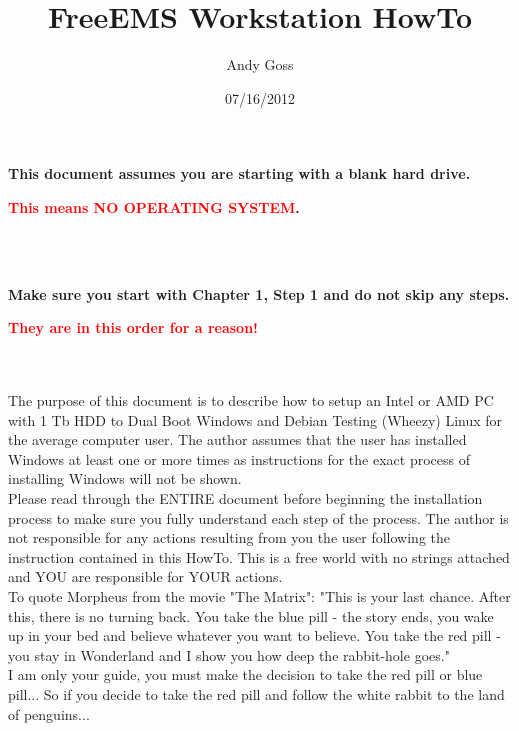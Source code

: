 \documentclass[12pt,notitlepage,onecolumn,oneside,openany]{memoir}
\title{\textsf{FreeEMS Workstation HowTo}}
\author{\textsf{Andy Goss}}
\date{\textsf{07/16/2012}}
\begin{document}
\maketitle

\centerline{\textbf{\textsf{This document assumes you are starting with a blank hard drive.}}} 
\centerline{\textbf{\textsf{\textcolor{red}{This means NO OPERATING SYSTEM}.}}}
\\
\textcolor{white}{\textsf{xyz}}
\\
\centerline{\textbf{\textsf{Make sure you start with Chapter 1, Step 1 and do not skip any steps.}}}
\centerline{\textbf{\textsf{\textcolor{red}{They are in this order for a reason!}}}}
\\
\textcolor{white}{\textsf{xyz2}}
\\
\textsf{The purpose of this document is to describe how to setup an Intel or AMD PC with 1 Tb HDD to Dual Boot Windows and Debian Testing (Wheezy) Linux for the average computer user.  The author assumes that the user has installed Windows at least one or more times as instructions for the exact process of installing Windows will not be shown.} \newline
\\
\textsf{Please read through the ENTIRE document before beginning the installation process to make sure you fully understand each step of the process.  The author is not responsible for any actions resulting from you the user following the instruction contained in this HowTo. This is a free world with no strings attached and YOU are responsible for YOUR actions.} \newline
\\
\textsf{To quote Morpheus from the movie "The Matrix": "This is your last chance. After this, there is no turning back. You take the blue pill - the story ends, you wake up in your bed and believe whatever you want to believe. You take the red pill - you stay in Wonderland and I show you how deep the rabbit-hole goes."} \newline
\\
\textsf{I am only your guide, you must make the decision to take the red pill or blue pill...} \newline
\textsf{So if you decide to take the red pill and follow the white rabbit to the land of penguins...} \newline

\pagebreak 

\tableofcontents

\newpage 
\end{document}
